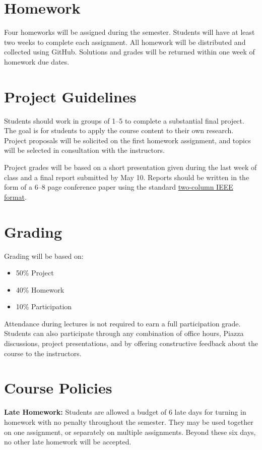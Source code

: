 \documentclass[11pt,letterpaper]{article}
\begin{document}
\section*{Homework}

Four homeworks will be assigned during the semester. Students will have at least two weeks to complete each assignment. All homework will be distributed and collected using GitHub. Solutions and grades will be returned within one week of homework due dates.

\section*{Project Guidelines}

Students should work in groups of 1--5 to complete a substantial final project. The goal is for students to apply the course content to their own research. Project proposals will be solicited on the first homework assignment, and topics will be selected in consultation with the instructors.

\medskip
\noindent
Project grades will be based on a short presentation given during the last week of class and a final report submitted by May 10. Reports should be written in the form of a 6--8 page conference paper using the standard \href{https://www.ieee.org/conferences/publishing/templates.html}{two-column IEEE format}.

\section*{Grading}

Grading will be based on:
\begin{itemize}
	\item 50\% Project
	\item 40\% Homework
	\item 10\% Participation
\end{itemize}
Attendance during lectures is not required to earn a full participation grade. Students can also participate through any combination of office hours, Piazza discussions, project presentations, and by offering constructive feedback about the course to the instructors.


\section*{Course Policies}

\textbf{Late Homework:} Students are allowed a budget of 6 late days for turning in homework with no penalty throughout the semester. They may be used together on one assignment, or separately on multiple assignments. Beyond these six days, no other late homework will be accepted.
\end{document}
